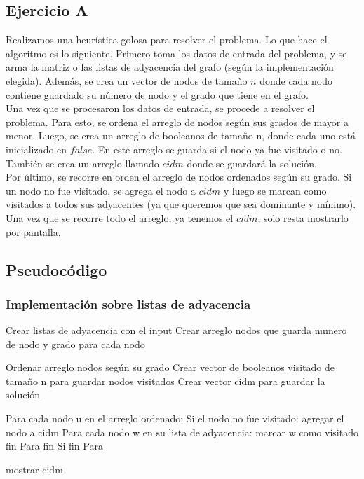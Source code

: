 
\subsection{Ejercicio A}
Realizamos una heurística golosa para resolver el problema. Lo que hace el algoritmo es lo siguiente. Primero toma los datos de entrada del problema, y se arma la matriz o las listas de adyacencia del grafo (según la implementación elegida). Además, se crea un vector de nodos de tamaño $n$ donde cada nodo contiene guardado su número de nodo y el grado que tiene en el grafo. \\
Una vez que se procesaron los datos de entrada, se procede a resolver el problema. Para esto, se ordena el arreglo de nodos según sus grados de mayor a menor. Luego, se crea un arreglo de booleanos de tamaño n, donde cada uno está inicializado en $false$. En este arreglo se guarda si el nodo ya fue visitado o no. También se crea un arreglo llamado $cidm$ donde se guardará la solución. \\
Por último, se recorre en orden el arreglo de nodos ordenados según su grado. Si un nodo no fue visitado, se agrega el nodo a $cidm$ y luego se marcan como visitados a todos sus adyacentes (ya que queremos que sea dominante y mínimo).
Una vez que se recorre todo el arreglo, ya tenemos el $cidm$, solo resta mostrarlo por pantalla.

\subsection{Pseudocódigo}

\subsubsection{Implementación sobre listas de adyacencia}
\begin{codesnippet}
Crear listas de adyacencia con el input
Crear arreglo nodos que guarda numero de nodo y grado para cada nodo

Ordenar arreglo nodos según su grado
Crear vector de booleanos visitado de tamaño n para guardar nodos visitados
Crear vector cidm para guardar la solución

Para cada nodo u en el arreglo ordenado:
	Si el nodo no fue visitado:
		agregar el nodo a cidm
		Para cada nodo w en su lista de adyacencia:
			marcar w como visitado
		fin Para
	fin Si
fin Para

mostrar cidm
\end{codesnippet}

